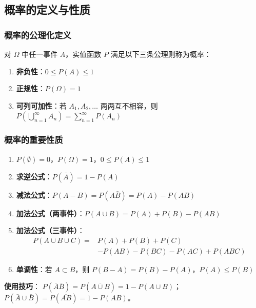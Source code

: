 \documentclass[12pt, a4paper]{article}
\begin{document}
\subsection{概率的定义与性质}

\subsubsection{概率的公理化定义}

\begin{tcolorbox}[defbox, title={公理化定义}]
    对 $\Omega$ 中任一事件 $A$，实值函数 $P$ 满足以下三条公理则称为概率：
    \begin{enumerate}
        \item \textbf{非负性}：$0 \le P(A) \le 1$
        \item \textbf{正规性}：$P(\Omega) = 1$
        \item \textbf{可列可加性}：若 $A_1, A_2, \ldots$ 两两互不相容，则
              $\displaystyle P\!\left(\bigcup_{n=1}^{\infty} A_n\right) = \sum_{n=1}^{\infty} P(A_n)$
    \end{enumerate}
\end{tcolorbox}

\subsubsection{概率的重要性质}

\begin{tcolorbox}[thmbox, title={核心性质（必须熟练掌握）}]
    \begin{enumerate}
        \item $P(\emptyset)=0$，$P(\Omega)=1$，$0\le P(A)\le 1$
        \item \textbf{求逆公式}：$P(\bar{A}) = 1 - P(A)$
        \item \textbf{减法公式}：$P(A-B) = P(A\bar{B}) = P(A) - P(AB)$
        \item \textbf{加法公式（两事件）}：$P(A\cup B) = P(A)+P(B)-P(AB)$
        \item \textbf{加法公式（三事件）}：
              \begin{align*}
                  P(A \cup B \cup C) = {} & P(A)+P(B)+P(C)            \\
                                          & -P(AB)-P(BC)-P(AC)+P(ABC)
              \end{align*}
        \item \textbf{单调性}：若 $A\subset B$，则 $P(B-A)=P(B)-P(A)$，$P(A)\le P(B)$
    \end{enumerate}
    \textbf{使用技巧}：
    $P(\bar{A}\bar{B}) = P(\overline{A\cup B}) = 1 - P(A\cup B)$；\\
    $P(\bar{A}\cup\bar{B}) = P(\overline{AB}) = 1 - P(AB)$。
\end{tcolorbox}
\end{document}
